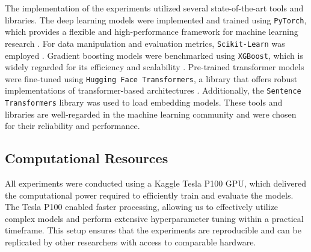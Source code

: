 The implementation of the experiments utilized several state-of-the-art tools and libraries. The deep learning models were implemented and trained using \texttt{PyTorch}, which provides a flexible and high-performance framework for machine learning research \citep{Paszke2019PyTorch}. For data manipulation and evaluation metrics, \texttt{Scikit-Learn} was employed \citep{Pedregosa2011ScikitLearn}. Gradient boosting models were benchmarked using \texttt{XGBoost}, which is widely regarded for its efficiency and scalability \citep{chen2016xgboost}. Pre-trained transformer models were fine-tuned using \texttt{Hugging Face Transformers}, a library that offers robust implementations of transformer-based architectures \citep{Wolf2019HuggingFace}. Additionally, the \texttt{Sentence Transformers}\cite{reimers-2019-sentence-bert}\cite{reimers-2020-multilingual-sentence-bert} library was used to load embedding models. These tools and libraries are well-regarded in the machine learning community and were chosen for their reliability and performance.

\subsection{Computational Resources}

All experiments were conducted using a Kaggle Tesla P100 GPU, which delivered the computational power required to efficiently train and evaluate the models. The Tesla P100 enabled faster processing, allowing us to effectively utilize complex models and perform extensive hyperparameter tuning within a practical timeframe. This setup ensures that the experiments are reproducible and can be replicated by other researchers with access to comparable hardware.




